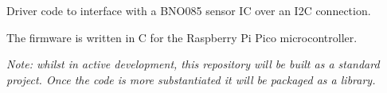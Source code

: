 Driver code to interface with a BNO085 sensor IC over an I2C connection.

The firmware is written in C for the Raspberry Pi Pico microcontroller.

{\itshape Note\+: whilst in active development, this repository will be built as a standard project. Once the code is more substantiated it will be packaged as a library.} 